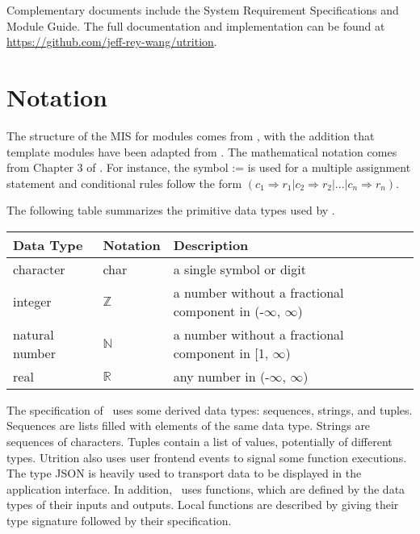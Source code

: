 \documentclass[12pt, titlepage]{article}
\begin{document}
Complementary documents include the System Requirement Specifications
and Module Guide.  The full documentation and implementation can be
found at \url{https://github.com/jeff-rey-wang/utrition}.  

\section{Notation}


The structure of the MIS for modules comes from \citet{HoffmanAndStrooper1995},
with the addition that template modules have been adapted from
\cite{GhezziEtAl2003}.  The mathematical notation comes from Chapter 3 of
\citet{HoffmanAndStrooper1995}.  For instance, the symbol := is used for a
multiple assignment statement and conditional rules follow the form $(c_1
\Rightarrow r_1 | c_2 \Rightarrow r_2 | ... | c_n \Rightarrow r_n )$.

The following table summarizes the primitive data types used by \progname. 

\begin{center}
\renewcommand{\arraystretch}{1.2}
\noindent 
\begin{tabular}{l l p{7.5cm}} 
\toprule 
\textbf{Data Type} & \textbf{Notation} & \textbf{Description}\\ 
\midrule
character & char & a single symbol or digit\\
integer & $\mathbb{Z}$ & a number without a fractional component in (-$\infty$, $\infty$) \\
natural number & $\mathbb{N}$ & a number without a fractional component in [1, $\infty$) \\
real & $\mathbb{R}$ & any number in (-$\infty$, $\infty$)\\
\bottomrule
\end{tabular} 
\end{center}

\noindent
The specification of \progname \ uses some derived data types: sequences, strings, and
tuples. Sequences are lists filled with elements of the same data type. Strings
are sequences of characters. Tuples contain a list of values, potentially of
different types. Utrition also uses user frontend events to signal some function executions. The type JSON is heavily used to transport data to be displayed in the application interface. In addition, \progname \ uses functions, which
are defined by the data types of their inputs and outputs. Local functions are
described by giving their type signature followed by their specification.
\end{document}
